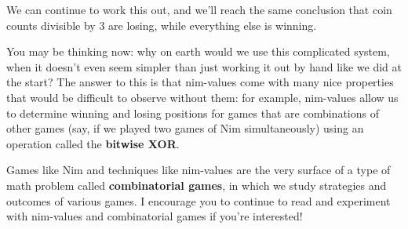 \documentclass{article}
\begin{document}
We can continue to work this out, and we'll reach the same conclusion that coin counts divisible by $3$ are losing, while everything else is winning.

You may be thinking now: why on earth would we use this complicated system, when it doesn't even seem simpler than just working it out by hand like we did at the start? The answer to this is that nim-values come with many nice properties that would be difficult to observe without them: for example, nim-values allow us to determine winning and losing positions for games that are combinations of other games (say, if we played two games of Nim simultaneously) using an operation called the \textbf{bitwise XOR}. 

Games like Nim and techniques like nim-values are the very surface of a type of math problem called \textbf{combinatorial games}, in which we study strategies and outcomes of various games. I encourage you to continue to read and experiment with nim-values and combinatorial games if you're interested!
\end{document}
